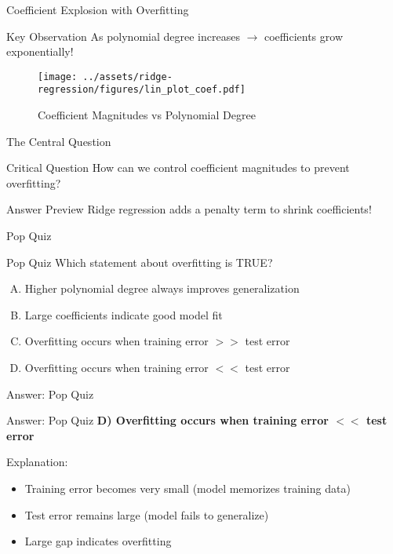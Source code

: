 \documentclass{beamer}
\begin{document}
\begin{frame}{Coefficient Explosion with Overfitting}
\begin{keypointsbox}{Key Observation}
As polynomial degree increases $\rightarrow$ coefficients grow exponentially!
\end{keypointsbox}
\vspace{0.05cm}
\begin{figure}\texttt{[image: ../assets/ridge-regression/figures/lin\_plot\_coef.pdf]}\caption{{\footnotesize Coefficient Magnitudes vs Polynomial Degree}}\end{figure}
\end{frame}

\begin{frame}{The Central Question}
\begin{alertbox}{Critical Question}
How can we control coefficient magnitudes to prevent overfitting?
\end{alertbox}
\pause

\begin{keypointsbox}{Answer Preview}
Ridge regression adds a penalty term to shrink coefficients!
\end{keypointsbox}
\end{frame}

\begin{frame}{Pop Quiz \thepopquiz}
\begin{popquizbox}{Pop Quiz \thepopquiz}
Which statement about overfitting is TRUE?
\begin{enumerate}[A)]
\item Higher polynomial degree always improves generalization
\item Large coefficients indicate good model fit
\item Overfitting occurs when training error $>>$ test error
\item Overfitting occurs when training error $<<$ test error
\end{enumerate}
\end{popquizbox}
\end{frame}

\begin{frame}{Answer: Pop Quiz \thepopquiz}
\begin{popquizbox}{Answer: Pop Quiz \thepopquiz}
\textbf{D) Overfitting occurs when training error $<<$ test error}

\vspace{0.3cm}
Explanation:
\begin{itemize}
\item Training error becomes very small (model memorizes training data)
\item Test error remains large (model fails to generalize)  
\item Large gap indicates overfitting
\end{itemize}
\end{popquizbox}
\end{frame}
\end{document}

